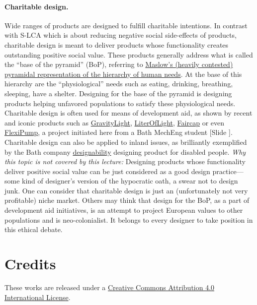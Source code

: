 \documentclass{article}
\newcounter{slide}
\begin{document}
\paragraph{Charitable design.} Wide ranges of products are designed to fulfill charitable intentions. In contrast with S-LCA which is about reducing negative social side-effects of products, charitable design is meant to deliver products whose functionality creates outstanding positive social value. These products generally address what is called the ``base of the pyramid'' (BoP), referring to \href{https://en.wikipedia.org/wiki/Maslow\%27s_hierarchy_of_needs}{Maslow's (heavily contested) pyramidal representation of the hierarchy of human needs}. At the base of this hierarchy are the ``physiological'' needs such as eating, drinking, breathing, sleeping, have a shelter. Designing for the base of the pyramid is designing products helping unfavored populations to satisfy these physiological needs. Charitable design is often used for means of development aid, as shown by recent and iconic products such as \href{https://gravitylight.org/}{GravityLight}, \href{http://literoflightswitzerland.org/}{LiterOfLight}, \href{http://faircap.org/}{Faircap} or even \href{https://www.flexipump.com/}{FlexiPump}, a project initiated here from a Bath MechEng student {\color{blue}[Slide ]}. Charitable design can also be applied to inland issues, as brilliantly exemplified by the Bath company \href{https://designability.org.uk/}{designability} designing product for disabled people. \emph{Why this topic is not covered by this lecture:} Designing products whose functionality deliver positive social value can be just considered as a good design practice---some kind of designer's version of the hypocratic oath, a swear not to design junk. One can consider that charitable design is just an (unfortunately not very profitable) niche market. Others may think that design for the BoP, as a part of development aid initiatives, is an attempt to project European values to other populations and is neo-colonialist. It belongs to every designer to take position in this ethical debate.

\section*{Credits}
\label{sec:credits}
These works are released under a \href{https://creativecommons.org/licenses/by/4.0/}{Creative Commons Attribution 4.0 International License}.



\end{document}
